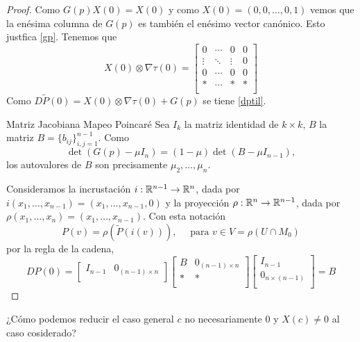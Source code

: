 \begin{proof} Como $G(p)X(0)=X(0)$ y como $X(0)=(0,0,\ldots,0,1)$ vemos que la enésima columna de $G(p)$ es también el enésimo vector canónico. Esto justfica 
\eqref{gp}.
Tenemos que
\[
 X(0)\otimes\nabla\tau(0)=\begin{bmatrix}
         0&\cdots&0&0\\
        \vdots &\ddots&\vdots&0\\
         0&\cdots&0&0\\
         *&\cdots&*&*\\
        \end{bmatrix}
\]
Como $D\tilde{P}(0)=X(0)\otimes\nabla\tau(0)+G(p)$ se tiene \eqref{dptil}.



{Matriz Jacobiana Mapeo Poincaré}
Sea $I_k$ la matriz identidad de $k\times k$, $B$ la matriz $B=\{b_{ij}\}_{i,j=1}^{n-1}$. Como
\[\det (G(p)-\mu I_n)=(1-\mu)\det (B-\mu I_{n-1}),\]
los autovalores de $B$ son precisamente $\mu_2,\ldots,\mu_n$.

Consideramos la incrustación $i:\mathbb{R}^{n-1}\to\mathbb{R}^n$, dada por $i(x_1,\ldots,x_{n-1})=(x_1,\ldots,x_{n-1},0)$ y la proyección
 $\rho:\mathbb{R}^{n}\to\mathbb{R}^{n-1}$,  dada por $\rho(x_1,\ldots,x_{n})=(x_1,\ldots,x_{n-1})$. Con esta notación
 \[P(v)=\rho(\tilde{P}(i(v))),\quad\text{ para } v\in V=\rho(U\cap M_0)\]
 por la regla de la cadena,
 \[DP(0)=\begin{bmatrix}
         I_{n-1}&0_{(n-1)\times n}\\
        \end{bmatrix}
        \begin{bmatrix}
         B&0_{(n-1)\times n}\\
         *&*\\
        \end{bmatrix}
        \begin{bmatrix}
         I_{n-1}\\0_{n\times (n-1)}\\
        \end{bmatrix} =B
  \]
\end{proof}



\begin{ejercicio}{} ¿Cómo podemos reducir el caso general $c$ no necesariamente $0$ y $X(c)\neq 0$ al caso cosiderado? 
\end{ejercicio}



